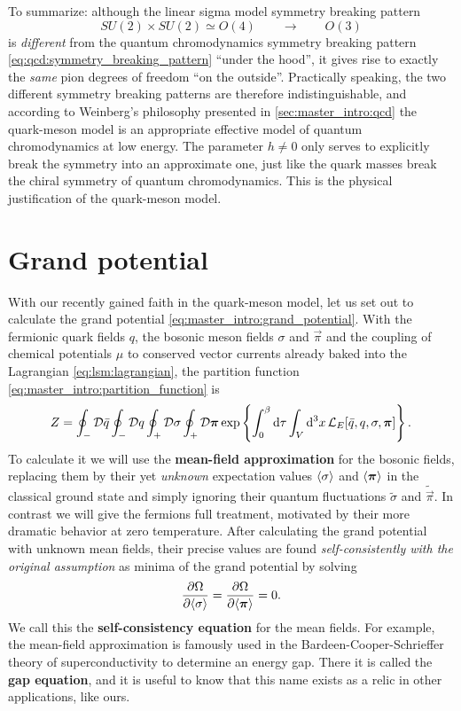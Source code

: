 To summarize: although the linear sigma model symmetry breaking pattern
\begin{equation}
	SU(2) \times SU(2) \simeq O(4) \qquad \longrightarrow \qquad O(3)
\end{equation}
is \emph{different} from the quantum chromodynamics symmetry breaking pattern \eqref{eq:qcd:symmetry_breaking_pattern} ``under the hood'',
it gives rise to exactly the \emph{same} pion degrees of freedom ``on the outside''.
Practically speaking, the two different symmetry breaking patterns are therefore indistinguishable,
and according to Weinberg's philosophy presented in \cref{sec:master_intro:qcd}
the quark-meson model is an appropriate effective model of quantum chromodynamics at low energy.
The parameter $h \neq 0$ only serves to explicitly break the symmetry into an approximate one,
just like the quark masses break the chiral symmetry of quantum chromodynamics.
This is the physical justification of the quark-meson model.

\section{Grand potential}
\label{sec:lsm:grand_potential}

With our recently gained faith in the quark-meson model,
let us set out to calculate the grand potential \eqref{eq:master_intro:grand_potential}.
With the fermionic quark fields $q$, the bosonic meson fields $\sigma$ and $\vec\pi$
and the coupling of chemical potentials $\mu$ to conserved vector currents already baked into the Lagrangian \eqref{eq:lsm:lagrangian},
the partition function \eqref{eq:master_intro:partition_function} is
\begin{equation}
	Z = \oint_- \mathcal{D} \bar{q} \oint_- \mathcal{D} q \oint_+ \mathcal{D} \sigma \oint_+ \mathcal{D} {\bm{\pi}} \exp \left\{ \int_0^\beta \mathop{}\!\mathrm{d} \tau \int_V \mathop{}\!\mathrm{d}^3 x \, \mathcal{L}_E[\bar{q}, q, \sigma, {\bm{\pi}}]  \right\} .
\end{equation}
To calculate it we will use the \textbf{mean-field approximation} for the bosonic fields,
replacing them by their yet \emph{unknown} expectation values $\langle \sigma \rangle$ and $\langle {\bm{\pi}} \rangle$ in the classical ground state
and simply ignoring their quantum fluctuations $\tilde{\sigma}$ and $\tilde{\vec\pi}$.
In contrast we will give the fermions full treatment,
motivated by their more dramatic behavior at zero temperature.
After calculating the grand potential with unknown mean fields,
their precise values are found \emph{self-consistently with the original assumption} as minima of the grand potential by solving
\begin{equation}
	\pdv{\Omega}{ \langle \sigma \rangle} = \pdv{\Omega}{ \langle {\bm{\pi}} \rangle} = 0.
\label{eq:lsm:gap_equation}
\end{equation}
We call this the \textbf{self-consistency equation} for the mean fields.
For example, the mean-field approximation is famously used in the Bardeen-Cooper-Schrieffer theory of superconductivity to determine an energy gap.
There it is called the \textbf{gap equation}, and it is useful to know that this name exists as a relic in other applications, like ours.

